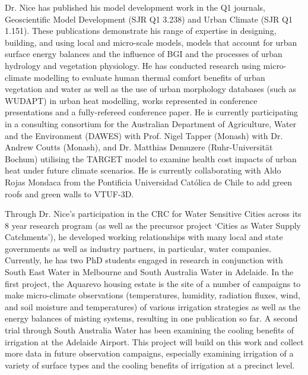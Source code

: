 Dr. Nice has published his model development work\cite{Nice2018a,Broadbent2019c,Meili2020,Dommenget2019} in the Q1 journals, Geoscientific Model Development (SJR Q1 3.238) and Urban Climate (SJR Q1 1.151). These publications demonstrate his range of expertise in designing, building, and using local and micro-scale models, models that account for urban surface energy balances and the influence of BGI and the processes of urban hydrology and vegetation physiology. He has conducted research using micro-climate modelling to evaluate human thermal comfort benefits of urban vegetation and water as well as the use of urban morphology databases (such as WUDAPT) in urban heat modelling, works represented in conference presentations\cite{Gal2020,Nice2020b} and a fully-refereed conference paper\cite{Todorovic2019a}. He is currently participating in a consulting consortium for the Australian Department of Agriculture, Water and the Environment (DAWES) with Prof. Nigel Tapper (Monash) with Dr. Andrew Coutts (Monash), and Dr. Matthias Demuzere (Ruhr-Universit\"{a}t Bochum) utilising the TARGET model to examine health cost impacts of urban heat under future climate scenarios. He is currently collaborating with Aldo Rojas Mondaca from the Pontificia Universidad Cat\'{o}lica de Chile to add green roofs and green walls to VTUF-3D.

Through Dr. Nice's participation in the CRC for Water Sensitive Cities across its 8 year research program (as well as the precursor project `Cities as Water Supply Catchments'), he developed working relationships with many local and state governments as well as industry partners, in particular, water companies. Currently, he has two PhD students engaged in research in conjunction with South East Water in Melbourne and South Australia Water in Adelaide. In the first project, the Aquarevo housing estate\cite{SEW2020} is the site of a number of campaigns to make micro-climate observations (temperatures, humidity, radiation fluxes, wind, and soil moisture and temperatures) of various irrigation strategies as well as the energy balances of misting systems, resulting in one publication \cite{Cheung2021} so far. A second trial through South Australia Water has been examining the cooling benefits of irrigation at the Adelaide Airport\cite{CRCWCS2018,Ingleton2020,Qian2020}. This project will build on this work and collect more data in future observation campaigns, especially examining irrigation of a variety of surface types and the cooling benefits of irrigation at a precinct level.

